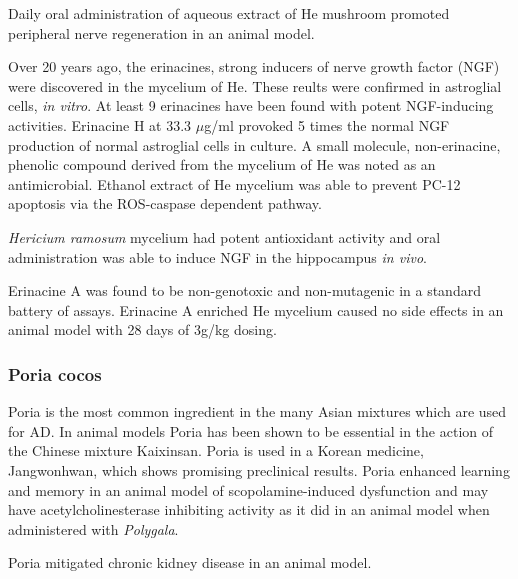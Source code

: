 \documentclass[twocolumn]{article}
\begin{document}
Daily oral administration of
aqueous extract of He mushroom
promoted peripheral nerve regeneration
in an animal model.
\cite{wong2011peripheral,
wong2014hericium}


Over 20 years ago, the erinacines,
strong inducers of nerve growth factor (NGF) were discovered
in the mycelium of He.
\cite{kawagishi1994erinacines}
These reults were confirmed in astroglial cells, \textit{in vitro}.
\cite{
kawagishi1996erinacines,
kawagishi1996erinacine}
At least 9 erinacines have been found with potent NGF-inducing
activities. Erinacine H at 33.3 $\mu$g/ml provoked 5 times
the normal NGF production of normal astroglial cells in culture.
\cite{
lee2000two,
kawagishi2006erinacines}
A small molecule, non-erinacine, phenolic compound derived from
the mycelium of He was noted as an antimicrobial.
\cite{okamoto1993antimicrobial}
Ethanol extract of He mycelium was able to
prevent PC-12 apoptosis via the ROS-caspase dependent pathway.
\cite{chang2016improvement}

\textit{Hericium ramosum} mycelium had potent antioxidant activity
and oral administration was able to
induce NGF in the hippocampus \textit{in vivo}.
\cite{suruga2015effects}

Erinacine A was found to be non-genotoxic and
non-mutagenic in a standard battery of assays.
\cite{li2014genotoxicity}
Erinacine A enriched He mycelium caused no side effects
in an animal model with 28 days of 3g/kg dosing.
\cite{li2014evaluation}









\subsubsection{Poria cocos}

Poria is the most common ingredient in the
many Asian mixtures which are used for AD.
In animal models Poria has been shown to be essential
in the action of the Chinese mixture Kaixinsan.
\cite{gao2010comparision}
Poria is used in a Korean medicine, Jangwonhwan,
which shows promising preclinical results.
\cite{seo2010modified}
Poria enhanced learning and memory in an animal
model of scopolamine-induced dysfunction
\cite{zhang2012effects}
and may have acetylcholinesterase inhibiting activity
as it did in an animal model when administered with
\textit{Polygala}.
\cite{li2011experimental}


Poria mitigated chronic kidney disease in an animal model.
\cite{zhao2013urinary}
\end{document}
